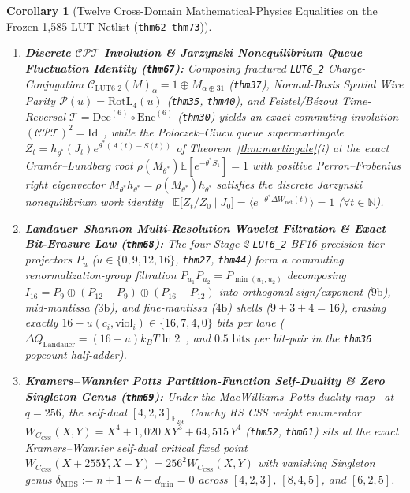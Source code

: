 \documentclass[11pt,letterpaper]{article}
\theoremstyle{spectralthm}
\newtheorem{corollary}[theorem]{Corollary}
\begin{document}
\begin{corollary}[Twelve Cross-Domain Mathematical-Physics Equalities on the Frozen 1,585-LUT Netlist (\texttt{thm62}--\texttt{thm73})]
\begin{enumerate}[leftmargin=1.4em,label=\textup{(\roman*)},topsep=2pt,itemsep=1.5pt]
  \item \textbf{Discrete $\mathcal{CPT}$ Involution \& Jarzynski Nonequilibrium Queue Fluctuation Identity (\texttt{thm67}):} Composing fractured \texttt{LUT6\_2} Charge-Conjugation $\mathcal{C}_{\mathrm{LUT6\_2}}(M)_\alpha = 1 \oplus M_{\alpha\oplus 31}$ (\texttt{thm37}), Normal-Basis Spatial Wire Parity $\mathcal{P}(u) = \mathrm{RotL}_4(u)$ (\texttt{thm35}, \texttt{thm40}), and Feistel/B\'{e}zout Time-Reversal $\mathcal{T} = \mathrm{Dec}^{(6)} \circ \mathrm{Enc}^{(6)}$ (\texttt{thm30}) yields an exact commuting involution $(\mathcal{C}\mathcal{P}\mathcal{T})^2 = \mathrm{Id}$~\cite{luders1954proof}, while the Poloczek--Ciucu queue supermartingale $Z_t = h_{\theta^*}(J_t)e^{\theta^*(A(t)-S(t))}$ of Theorem~\ref{thm:martingale}(i) at the exact Cram\'{e}r--Lundberg root $\rho(M_{\theta^*})\mathbb{E}[e^{-\theta^* S_1}] = 1$ with positive Perron--Frobenius right eigenvector $M_{\theta^*}h_{\theta^*} = \rho(M_{\theta^*})h_{\theta^*}$ satisfies the discrete Jarzynski nonequilibrium work identity~\cite{jarzynski1997nonequilibrium} $\mathbb{E}\bigl[Z_t / Z_0 \mid J_0\bigr] = \langle e^{-\theta^* \Delta W_{\mathrm{net}}(t)}\rangle = 1$ ($\forall t \in \mathbb{N}$).
  \item \textbf{Landauer--Shannon Multi-Resolution Wavelet Filtration \& Exact Bit-Erasure Law (\texttt{thm68}):} The four Stage-2 \texttt{LUT6\_2} BF16 precision-tier projectors $P_u$ ($u \in \{0,9,12,16\}$, \texttt{thm27}, \texttt{thm44}) form a commuting renormalization-group filtration $P_{u_1}P_{u_2} = P_{\min(u_1,u_2)}$ decomposing $I_{16} = P_9 \oplus (P_{12}-P_9) \oplus (P_{16}-P_{12})$ into orthogonal sign/exponent ($9\text{b}$), mid-mantissa ($3\text{b}$), and fine-mantissa ($4\text{b}$) shells ($9+3+4=16$), erasing exactly $16 - u(c_i,\mathrm{viol}_i) \in \{16,7,4,0\}$ bits per lane ($\Delta Q_{\mathrm{Landauer}} = (16-u)k_B T\ln 2$~\cite{1}, and $0.5\text{~bits}$ per bit-pair in the \texttt{thm36} popcount half-adder).
  \item \textbf{Kramers--Wannier Potts Partition-Function Self-Duality \& Zero Singleton Genus (\texttt{thm69}):} Under the MacWilliams--Potts duality map~\cite{macwilliams1977theorytheorytheorytheorytheorytheorytheorytheorytheorytheorytheorytheorytheorytheorytheorytheory, kramers1941statistics} at $q=256$, the self-dual $[4,2,3]_{\mathbb{F}_{256}}$ Cauchy RS CSS weight enumerator $W_{C_{\mathrm{CSS}}}(X,Y) = X^4 + 1{,}020\,XY^3 + 64{,}515\,Y^4$ (\texttt{thm52}, \texttt{thm61}) sits at the exact Kramers--Wannier self-dual critical fixed point $W_{C_{\mathrm{CSS}}}(X+255Y, X-Y) = 256^2 W_{C_{\mathrm{CSS}}}(X,Y)$ with vanishing Singleton genus $\delta_{\mathrm{MDS}} := n + 1 - k - d_{\min} = 0$ across $[4,2,3]$, $[8,4,5]$, and $[6,2,5]$.

\end{enumerate}
\end{corollary}
\end{document}
